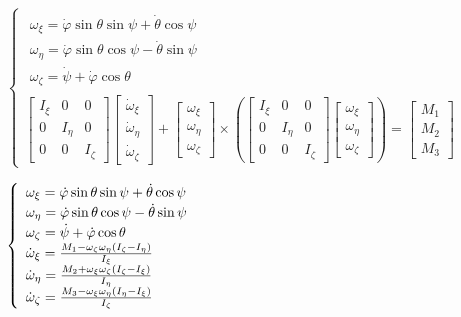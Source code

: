 \documentclass[a4paper, 12pt]{article}%
\begin{document}
	$\begin{cases}
		
		\begin{array}{l}\omega_{\xi}=\dot{\varphi} \sin \theta \sin \psi+\dot{\theta} \cos \psi \\ \omega_\eta=\dot{\varphi} \sin \theta \cos \psi-\dot{\theta} \sin \psi \\ \omega_\zeta=\dot{\psi}+\dot{\varphi} \cos \theta\end{array} \\
		\left[\begin{array}{ccc}I_{\xi} & 0 & 0 \\ 0 & I_{\eta} & 0 \\ 0 & 0 & I_{\zeta}\end{array}\right]\left[\begin{array}{l}\dot{\omega}_{\xi} \\ \dot{\omega}_\eta \\ \dot{\omega}_{\zeta}\end{array}\right]+\left[\begin{array}{l}\omega_{\xi} \\ \omega_\eta \\ \omega_{\zeta}\end{array}\right] \times\left(\left[\begin{array}{ccc}I_{\xi} & 0 & 0 \\ 0 & I_{\eta} & 0 \\ 0 & 0 & I_\zeta\end{array}\right]\left[\begin{array}{l}\omega_{\xi} \\ \omega_\eta \\ \omega_{\zeta}\end{array}\right]\right)=\left[\begin{array}{l}M_1 \\ M_2 \\ M_3\end{array}\right]
	\end{cases}$
	
\addvspace{20pt}


	$
	\begin{cases}
		\begin{array}{l}\omega_{\xi}=\dot{\varphi} \sin \theta \sin \psi+\dot{\theta} \cos \psi \\ \omega_\eta=\dot{\varphi} \sin \theta \cos \psi-\dot{\theta} \sin \psi \\ \omega_\zeta=\dot{\psi}+\dot{\varphi} \cos \theta\end{array} \\
		\begin{array}{l}\dot\omega_{\xi} = \frac{M_1 -\omega_{\zeta}\omega_{\eta}(I_{\zeta} - I_{\eta})}{I_{\xi}}\\
		\dot\omega_{\eta} = \frac{M_2 +\omega_{\xi}\omega_{\zeta}(I_{\zeta} - I_{\xi})}{I_{\eta}}\\
		\dot\omega_{\zeta} = \frac{M_3 -\omega_{\xi}\omega_{\eta}(I_{\eta} - I_{\xi})}{I_{\zeta}}\\
		\end{array}
	\end{cases}\\
	$
	
\end{document}
